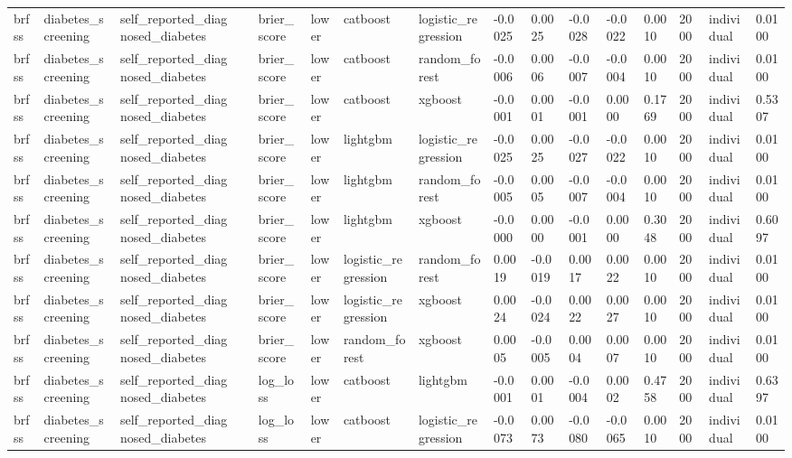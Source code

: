 \begin{tabular}{llllllllllllllll}
brfss & diabetes\_screening & self\_reported\_diagnosed\_diabetes &  & brier\_score & lower & catboost & logistic\_regression & -0.0025 & 0.0025 & -0.0028 & -0.0022 & 0.0010 & 2000 & individual & 0.0100 \\
brfss & diabetes\_screening & self\_reported\_diagnosed\_diabetes &  & brier\_score & lower & catboost & random\_forest & -0.0006 & 0.0006 & -0.0007 & -0.0004 & 0.0010 & 2000 & individual & 0.0100 \\
brfss & diabetes\_screening & self\_reported\_diagnosed\_diabetes &  & brier\_score & lower & catboost & xgboost & -0.0001 & 0.0001 & -0.0001 & 0.0000 & 0.1769 & 2000 & individual & 0.5307 \\
brfss & diabetes\_screening & self\_reported\_diagnosed\_diabetes &  & brier\_score & lower & lightgbm & logistic\_regression & -0.0025 & 0.0025 & -0.0027 & -0.0022 & 0.0010 & 2000 & individual & 0.0100 \\
brfss & diabetes\_screening & self\_reported\_diagnosed\_diabetes &  & brier\_score & lower & lightgbm & random\_forest & -0.0005 & 0.0005 & -0.0007 & -0.0004 & 0.0010 & 2000 & individual & 0.0100 \\
brfss & diabetes\_screening & self\_reported\_diagnosed\_diabetes &  & brier\_score & lower & lightgbm & xgboost & -0.0000 & 0.0000 & -0.0001 & 0.0000 & 0.3048 & 2000 & individual & 0.6097 \\
brfss & diabetes\_screening & self\_reported\_diagnosed\_diabetes &  & brier\_score & lower & logistic\_regression & random\_forest & 0.0019 & -0.0019 & 0.0017 & 0.0022 & 0.0010 & 2000 & individual & 0.0100 \\
brfss & diabetes\_screening & self\_reported\_diagnosed\_diabetes &  & brier\_score & lower & logistic\_regression & xgboost & 0.0024 & -0.0024 & 0.0022 & 0.0027 & 0.0010 & 2000 & individual & 0.0100 \\
brfss & diabetes\_screening & self\_reported\_diagnosed\_diabetes &  & brier\_score & lower & random\_forest & xgboost & 0.0005 & -0.0005 & 0.0004 & 0.0007 & 0.0010 & 2000 & individual & 0.0100 \\
brfss & diabetes\_screening & self\_reported\_diagnosed\_diabetes &  & log\_loss & lower & catboost & lightgbm & -0.0001 & 0.0001 & -0.0004 & 0.0002 & 0.4758 & 2000 & individual & 0.6397 \\
brfss & diabetes\_screening & self\_reported\_diagnosed\_diabetes &  & log\_loss & lower & catboost & logistic\_regression & -0.0073 & 0.0073 & -0.0080 & -0.0065 & 0.0010 & 2000 & individual & 0.0100 \\

\end{tabular}
